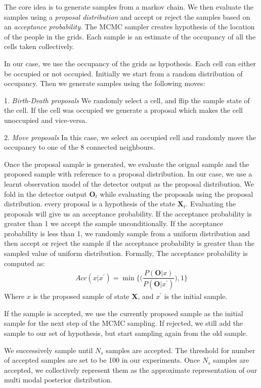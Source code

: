 The core idea is to generate samples from a markov chain. We then evaluate the samples using a \textit{proposal distribution} and accept or reject the samples based on an \textit{acceptance probability}. The MCMC sampler creates hypothesis of the location of the people in the grids. Each sample is an estimate of the occupancy of all the cells taken collectively. 

In our case, we use the occupancy of the grids as hypothesis. Each cell can either be occupied or not occupied. Initially we start from a random distribution of occupancy. Then we generate samples using the following moves:

1. \textit{Birth-Death proposals}
We randomly select a cell, and flip the sample state of the cell. If the cell was occupied we generate a proposal which makes the cell unoccupied and vice-versa.

2. \textit{Move proposals}
In this case, we select an occupied cell and randomly move the occupancy to one of the 8 connected neighbours.

Once the proposal sample is generated, we evaluate the orignal sample and the proposed sample with reference to a proposal distribution. In our case, we use a learnt observation model of the detector output as the proposal distribution. We fold in the detector output $\textbf{O}_{t}$ while evaluating the proposals using the proposal distribution. every proposal is a hypothesis of the state $\textbf{X}_{t}$.
Evaluating the proposals will give us an acceptance probability. If the acceptance probability is greater than 1 we accept the sample unconditionally. If the acceptance probability is less than 1, we randomly sample from a uniform distribution and then accept or reject the sample if the acceptance probability is greater than the sampled value of uniform distribution. Formally,
The acceptance probability is computed as:
\begin{align}
Acc(x|x^{'}) = \min\Big\lbrace\Big(\dfrac{P(\textbf{O}|x)}{P(\textbf{O}|x^{'})}\Big),1\Big\rbrace
\end{align}
Where $x$ is the proposed sample of state \textbf{X}, and $x^{'}$ is the initial sample.

If the sample is accepted, we use the currently proposed sample as the initial sample for the next step of the MCMC sampling. If rejected, we still add the sample to our set of hypothesis, but start sampling again from the old sample.

We successively sample until $N_{s}$ samples are accepted. The threshold for number of accepted samples are set to be 100 in our experiments. Once $N_{s}$ samples are accepted, we collectively represent them as the approximate representation of our multi modal posterior distribution.